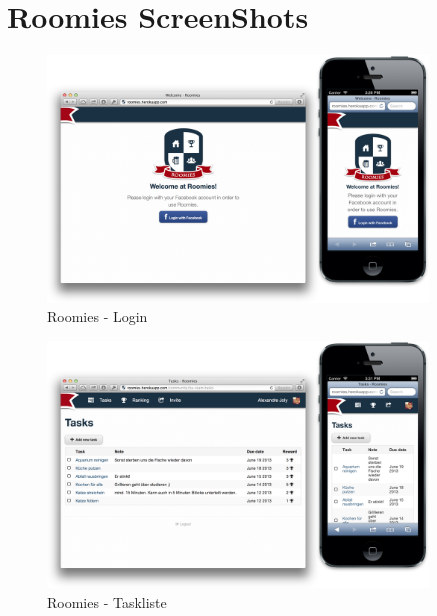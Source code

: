 \chapter{Roomies ScreenShots}
\label{sec:roomies-screenshots}

\begin{figure}[H]
	\centering
	\includegraphics[width=0.9\textwidth]{content/appendix/roomies-screenshots/login.png}
	\caption{Roomies - Login}
	\label{fig:roomies-ss-login}
\end{figure}

\begin{figure}[H]
	\centering
	\includegraphics[width=0.9\textwidth]{content/appendix/roomies-screenshots/task.png}
	\caption{Roomies - Taskliste}
	\label{fig:roomies-ss-task}
\end{figure}

